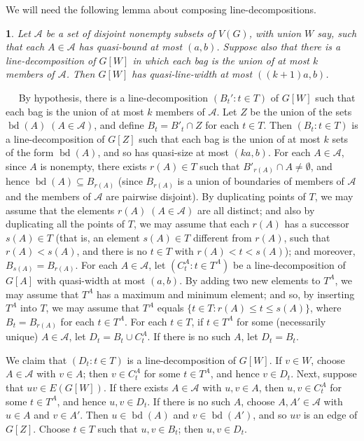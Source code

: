 \documentclass[titlepage,11pt]{article}
\newcommand{\bd}{\operatorname{bd}}
\newcommand{\mac}{\mathcal}
\newtheorem{thm}{}[section]
\newcommand{\Proof}{\noindent{\bf Proof.}\ \ }
\begin{document}
	We will need the following lemma about composing line-decompositions.
	\begin{thm}\label{composeline}
		Let $\mathcal{A}$ be a set of disjoint nonempty subsets of $V(G)$, with union $W$ say, such that each $A\in \mathcal{A}$
		has quasi-bound at most
		$(a,b)$. Suppose also that there is a line-decomposition of
		$G[W]$ in which each bag is the union of at most $k$ members of $\mathcal{A}$. Then $G[W]$ has quasi-line-width at most $((k+1)a,b)$.
	\end{thm}
	\Proof
	By hypothesis, there is a line-decomposition $(B_t':t\in T)$
	of $G[W]$
	such that each bag is the union of at most $k$ members of $\mac A$. 
	Let $Z$ be the union of the sets $\bd(A)\;(A\in \mathcal{A})$, and define $B_t=B'_t\cap Z$ for each $t\in T$. Then $(B_t:t\in T)$ 
	is a line-decomposition 
	of $G[Z]$
	such that each bag is the union of at most $k$ sets of the form $\bd(A)$, and so has quasi-size at most $(ka,b)$. For each $A\in \mathcal{A}$,
	since $A$ is nonempty, there exists $r(A)\in T$ such that $B'_{r(A)}\cap A\ne \emptyset$, and hence $\bd(A)\subseteq B_{r(A)}$ (since  $B_{r(A)}$ is a union of
	boundaries of members of $\mac A$ and the members of $\mac A$ are pairwise disjoint).
	By duplicating points of $T$, we may assume that the elements
	$r(A)\;(A\in \mathcal{A})$ are all distinct; and also by duplicating all the points of $T$, we may assume that each $r(A)$ has a successor 
	$s(A)\in T$ (that is,
	an element $s(A)\in T$ different from $r(A)$, such that $r(A)<s(A)$, and there is no $t\in T$ with $r(A)<t<s(A)$); and moreover, $B_{s(A)}=B_{r(A)}$. For each $A\in \mathcal{A}$,
	let $(C_t^A:t\in T^A)$ be a line-decomposition of $G[A]$ with quasi-width at most $(a,b)$. By adding two new elements to $T^A$, we may assume that
	$T^A$ has a maximum and minimum element; and so, by inserting $T^A$ into $T$, we may assume that $T^A$ equals
	$\{t\in T:r(A)\le t\le s(A)\}$, where $B_t = B_{r(A)}$ for each $t\in T^A$. For each $t\in T$, if $t\in T^A$ for some (necessarily unique) $A\in \mathcal{A}$, let
	$D_t=B_t\cup C^A_t$. If there is no such $A$, let $D_t=B_t$.
	
	We claim that $(D_t:t\in T)$ is a line-decomposition of $G[W]$. If $v\in W$, choose $A\in \mathcal{A}$ with $v\in A$; then $v\in C^A_t$
	for some $t\in T^A$, and hence $v\in D_t$. Next, suppose that $uv\in E(G[W])$.  If there exists $A\in \mathcal{A}$ with $u,v\in A$,
	then $u,v\in C^A_t$
	for some $t\in T^A$, and hence $u,v\in D_t$. If there is no such $A$, choose $A,A'\in \mathcal{A}$ with $u\in A$ and $v\in A'$.
	Then $u\in \bd(A)$ and $v\in \bd(A')$, and so $uv$ is an edge of $G[Z]$. Choose $t\in T$ such that $u,v\in B_t$; then $u,v\in D_t$.
	
\end{document}
